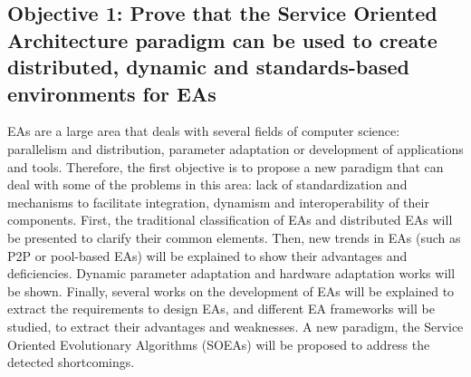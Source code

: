 \newcommand{\objectiveparadigm}{Prove that the Service Oriented Architecture paradigm can be used to create distributed, dynamic and standards-based environments for EAs}


 \subsection*{Objective 1: \objectiveparadigm}
\label{subsec:intro:obj:problems}
EAs are a large area that deals with several fields of computer science: parallelism and distribution, parameter adaptation or development of applications and tools. Therefore, the first objective is to propose a new paradigm that can deal with some of the problems in this area: lack of standardization and mechanisms to facilitate integration, dynamism and interoperability of their components. First, the traditional classification of EAs and distributed EAs will be presented to clarify their common elements. Then, new trends in EAs (such as P2P or pool-based EAs) will be explained to show their advantages and deficiencies. Dynamic parameter adaptation and hardware adaptation works will be shown. Finally, several works on the development of EAs will be explained to extract the requirements to design EAs, and different EA frameworks will be studied, to extract their advantages and weaknesses. A new paradigm, the Service Oriented Evolutionary Algorithms (SOEAs) will be proposed to address the detected shortcomings.

